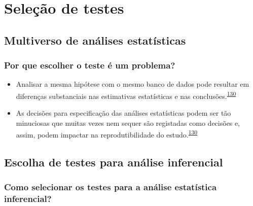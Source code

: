 \documentclass[
  a4paper,
]{book}
\begin{document}
\hypertarget{selecao-testes}{%
\chapter{\texorpdfstring{\textbf{Seleção de testes}}{Seleção de testes}}\label{selecao-testes}}

\hypertarget{multiverso-estatistica}{%
\section{Multiverso de análises estatísticas}\label{multiverso-estatistica}}

\hypertarget{por-que-escolher-o-teste-uxe9-um-problema}{%
\subsection{Por que escolher o teste é um problema?}\label{por-que-escolher-o-teste-uxe9-um-problema}}

\begin{itemize}
\item
  Analisar a mesma hipótese com o mesmo banco de dados pode resultar em diferenças substanciais nas estimativas estatísticas e nas conclusões.\textsuperscript{\protect\hyperlink{ref-Breznau2022}{130}}
\item
  As decisões para especificação das análises estatísticas podem ser tão minuciosas que muitas vezes nem sequer são registadas como decisões e, assim, podem impactar na reprodutibilidade do estudo.\textsuperscript{\protect\hyperlink{ref-Breznau2022}{130}}
\end{itemize}

\hypertarget{escolha-analise-inferencial}{%
\section{Escolha de testes para análise inferencial}\label{escolha-analise-inferencial}}

\hypertarget{como-selecionar-os-testes-para-a-anuxe1lise-estatuxedstica-inferencial}{%
\subsection{Como selecionar os testes para a análise estatística inferencial?}\label{como-selecionar-os-testes-para-a-anuxe1lise-estatuxedstica-inferencial}}
\end{document}
